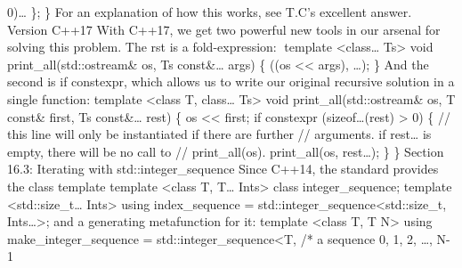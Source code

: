 0)\ldots{} \}; \} For an explanation of how this works, see T.C's
excellent answer. Version C++17 With C++17, we get two powerful new
tools in our arsenal for solving this problem. The rst is a
fold-expression: template \textless class\ldots{} Ts\textgreater{} void
print\_all(std::ostream\& os, Ts const\&\ldots{} args) \{ ((os
\textless\textless{} args), \ldots); \} And the second is if constexpr,
which allows us to write our original recursive solution in a single
function: template \textless class T, class\ldots{} Ts\textgreater{}
void print\_all(std::ostream\& os, T const\& first, Ts const\&\ldots{}
rest) \{ os \textless\textless{} first; if constexpr (sizeof\ldots(rest)
\textgreater{} 0) \{ // this line will only be instantiated if there are
further // arguments. if rest\ldots{} is empty, there will be no call to
// print\_all(os). print\_all(os, rest\ldots); \} \} Section 16.3:
Iterating with std::integer\_sequence Since C++14, the standard provides
the class template template \textless class T, T\ldots{}
Ints\textgreater{} class integer\_sequence; template
\textless std::size\_t\ldots{} Ints\textgreater{} using index\_sequence
= std::integer\_sequence\textless std::size\_t, Ints\ldots\textgreater;
and a generating metafunction for it: template \textless class T, T
N\textgreater{} using make\_integer\_sequence =
std::integer\_sequence\textless T, /* a sequence 0, 1, 2, \ldots, N-1

